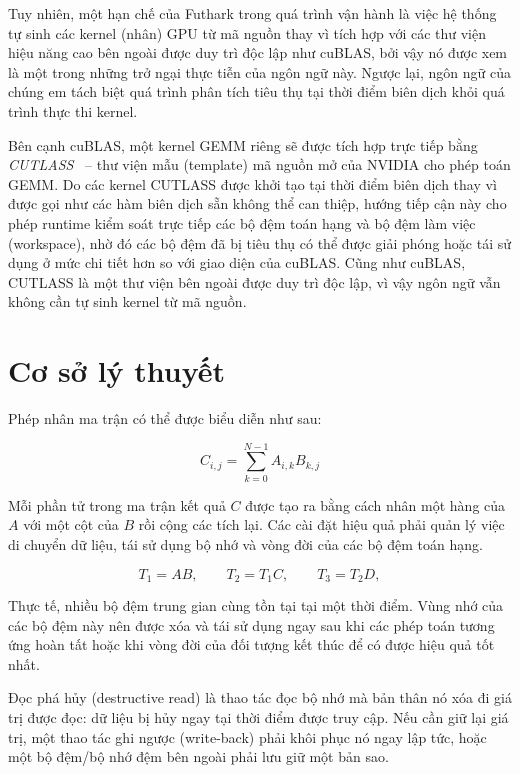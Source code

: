 \documentclass[a4paper]{article}
\begin{document}
	Tuy nhiên, một hạn chế của Futhark trong quá trình vận hành là việc hệ thống tự sinh các kernel (nhân) GPU từ mã nguồn thay vì tích hợp với các thư viện hiệu năng cao bên ngoài được duy trì độc lập như cuBLAS, bởi vậy nó được xem là một trong những trở ngại thực tiễn của ngôn ngữ này. Ngược lại, ngôn ngữ của chúng em tách biệt quá trình phân tích tiêu thụ tại thời điểm biên dịch khỏi quá trình thực thi kernel.

	Bên cạnh cuBLAS, một kernel GEMM riêng sẽ được tích hợp trực tiếp bằng \emph{CUTLASS}~\cite{cutlass} -- thư viện mẫu (template) mã nguồn mở của NVIDIA cho phép toán GEMM. Do các kernel CUTLASS được khởi tạo tại thời điểm biên dịch thay vì được gọi như các hàm biên dịch sẵn không thể can thiệp, hướng tiếp cận này cho phép runtime kiểm soát trực tiếp các bộ đệm toán hạng và bộ đệm làm việc (workspace), nhờ đó các bộ đệm đã bị tiêu thụ có thể được giải phóng hoặc tái sử dụng ở mức chi tiết hơn so với giao diện của cuBLAS. Cũng như cuBLAS, CUTLASS là một thư viện bên ngoài được duy trì độc lập, vì vậy ngôn ngữ vẫn không cần tự sinh kernel từ mã nguồn.
	
	\section{Cơ sở lý thuyết}
	
	Phép nhân ma trận có thể được biểu diễn như sau:
	
	\begin{equation}
		C_{i,j} = \sum_{k=0}^{N-1} A_{i,k}B_{k,j}
	\end{equation}
	
	Mỗi phần tử trong ma trận kết quả $C$ được tạo ra bằng cách nhân một hàng của $A$ với một cột của $B$ rồi cộng các tích lại. Các cài đặt hiệu quả phải quản lý việc di chuyển dữ liệu, tái sử dụng bộ nhớ và vòng đời của các bộ đệm toán hạng.
	
	\begin{equation}
		T_1 = A B,\qquad
		T_2 = T_1 C,\qquad
		T_3 = T_2 D,
	\end{equation}
	
	Thực tế, nhiều bộ đệm trung gian cùng tồn tại tại một thời điểm. Vùng nhớ của các bộ đệm này nên được xóa và tái sử dụng ngay sau khi các phép toán tương ứng hoàn tất hoặc khi vòng đời của đối tượng kết thúc để có được hiệu quả tốt nhất.
	
	
	Đọc phá hủy (destructive read) là thao tác đọc bộ nhớ mà bản thân nó xóa đi giá trị được đọc: dữ liệu bị hủy ngay tại thời điểm được truy cập. Nếu cần giữ lại giá trị, một thao tác ghi ngược (write-back) phải khôi phục nó ngay lập tức, hoặc một bộ đệm/bộ nhớ đệm bên ngoài phải lưu giữ một bản sao.
	
\end{document}
